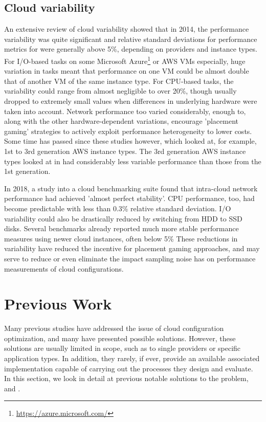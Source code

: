 \documentclass{report}
\begin{document}
\subsection{Cloud variability}
An extensive review of cloud variability showed that in 2014, the performance variability was quite significant and relative standard deviations for performance metrics for were generally above 5\%, depending on providers and instance types\cite{Leitner2014}. For I/O-based tasks on some Microsoft Azure\footnote{\url{https://azure.microsoft.com/}} or AWS VMs especially, huge variation in tasks meant that performance on one VM could be almost double that of another VM of the same instance type. For CPU-based tasks, the variability could range from almost negligible to over 20\%, though usually dropped to extremely small values when differences in underlying hardware were taken into account. Network performance too varied considerably, enough to, along with the other hardware-dependent variations, encourage 'placement gaming' strategies to actively exploit performance heterogeneity to lower costs\cite{Farley2012}. Some time has passed since these studies however, which looked at, for example, 1st to 3rd generation AWS instance types. The 3rd generation AWS instance types looked at in \cite{Leitner2014} had considerably less variable performance than those from the 1st generation.

In 2018, a study into a cloud benchmarking suite found that intra-cloud network performance had achieved 'almost perfect stability'\cite{Scheuner2018, Scheuner2018a}. CPU performance, too, had become predictable with less than 0.3\% relative standard deviation\cite{Scheuner2018}. I/O variability could also be drastically reduced by switching from HDD to SSD disks. Several benchmarks already reported much more stable performance measures using newer cloud instances, often below 5\%\cite{Davatz2017, Laaber2019} These reductions in variability have reduced the incentive for placement gaming approaches, and may serve to reduce or even eliminate the impact sampling noise has on performance measurements of cloud configurations.

\section{Previous Work}
Many previous studies have addressed the issue of cloud configuration optimization, and many have presented possible solutions. However, these solutions are usually limited in scope, such as to single providers or specific application types. In addition, they rarely, if ever, provide an available associated implementation capable of carrying out the processes they design and evaluate. In this section, we look in detail at previous notable solutions to the problem, and .
\end{document}
